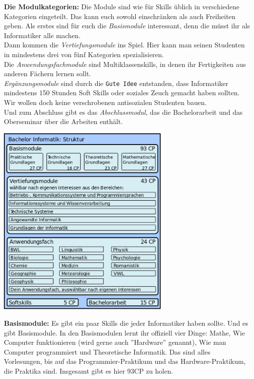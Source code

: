 \textbf{Die Modulkategorien:}
Die Module sind wie f\"ur Skills \"ublich in verschiedene Kategorien
eingeteilt. Das kann euch sowohl einschr\"anken als auch Freiheiten geben.
Als erstes sind f\"ur euch die \emph{Basismodule} interessant, denn die m\"usst ihr als Informatiker alle machen.\\
Dann kommen die \emph{Vertiefungsmodule} ins Spiel. Hier kann man seinen Studenten in mindestens drei von f\"unf Kategorien spezialisieren.\\
Die \emph{Anwendungsfachmodule} sind Multiklassenskills, in denen ihr Fertigkeiten aus anderen F\"achern lernen sollt.\\
\emph{Erg\"anzungsmodule} sind durch die \texttt{Gute Idee\texttrademark} entstanden, dass Informatiker mindestens 150 Stunden Soft Skills oder soziales Zeuch gemacht haben sollten. Wir wollen doch keine verschrobenen antisozialen Studenten bauen.\\
Und zum Abschluss gibt es das \emph{Abschlussmodul}, das die Bachelorarbeit und das Oberseminar \"uber die Arbeiten enth\"alt.\\

\begin{center}
\includegraphics[width=85mm]{bilder/BacInfStruktur}
\end{center}


\textbf{Basismodule:}
Es gibt ein paar Skills die jeder Informatiker haben sollte. Und es gibt
Basismodule. In den Basismodulen lernt ihr offiziell vier Dinge: Mathe, Wie
Computer funktionieren (wird gerne auch ''Hardware'' genannt), Wie man Computer
programmiert und Theoretische Informatik. Das sind alles Vorlesungen, bis auf
das Programmier-Praktikum und das Hardware-Praktikum, die Praktika sind.
Insgesamt gibt es hier 93CP zu holen.

